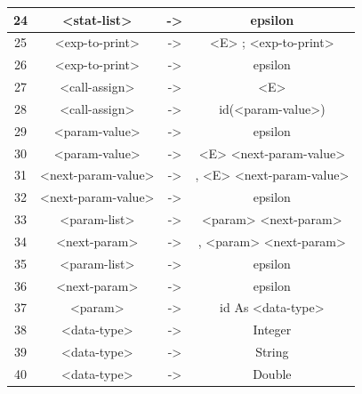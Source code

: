 \documentclass[11pt,a4paper]{article}
\begin{document}
\begin{center}
\begin{tabular}{|c||c|c|c|}
	\hline
	24&<stat-list> &->& epsilon\\
	\hline
	25&<exp-to-print> &->& <E> ; <exp-to-print>\\
	\hline
	26&<exp-to-print> &->& epsilon\\
	\hline
	27&<call-assign> &->& <E>\\
	\hline
	28&<call-assign> &->& id(<param-value>)\\
	\hline
	29&<param-value> &->& epsilon\\
	\hline
	30&<param-value> &->& <E> <next-param-value>\\
	\hline
	31&<next-param-value> &->& , <E> <next-param-value>\\
	\hline
	32&<next-param-value> &->& epsilon\\
	\hline
	33&<param-list> &->& <param> <next-param>\\
	\hline
	34&<next-param> &->& , <param> <next-param>\\
	\hline
	35&<param-list> &->& epsilon\\
	\hline
	36&<next-param> &->& epsilon\\
	\hline
	37&<param> &->& id As <data-type>\\
	\hline
	38&<data-type> &->& Integer\\
	\hline
	39&<data-type> &->& String\\
	\hline
	40&<data-type> &->& Double\\
	\hline

	\end{tabular}
	\end{center}
\end{document}
